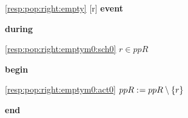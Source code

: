 \noindent \ref{resp:pop:right:empty} [r] \textbf{event}
\begin{block}
  \item   \textbf{during}
  \begin{block}
  \item[ \eqref{resp:pop:right:emptym0:sch0} ]{$r \in ppR $} %
  \end{block}
  \item   \textbf{begin}
  \begin{block}
  \item[ \eqref{resp:pop:right:emptym0:act0} ]{$ppR \mathrel{:\mkern1mu=} ppR \setminus \{ r \} $} %
  \end{block}
  \item   \textbf{end} \\
\end{block}
